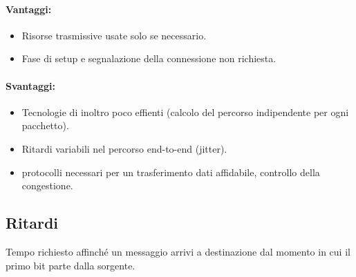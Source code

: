     \paragraph*{Vantaggi:}
    \begin{itemize}
        \item Risorse trasmissive usate solo se necessario.
        \item Fase di setup e segnalazione della connessione non richiesta.
    \end{itemize}

    \paragraph*{Svantaggi:}
    \begin{itemize}
        \item Tecnologie di inoltro poco effienti (calcolo del percorso indipendente per ogni pacchetto).
        \item Ritardi variabili nel percorso end-to-end (jitter).
        \item protocolli necessari per un trasferimento dati affidabile, controllo della congestione.
    \end{itemize}

    \subsection{Ritardi}

    \begin{definition}[Latenza] 
        Tempo richiesto affinché un messaggio arrivi a destinazione dal momento in cui il primo bit parte dalla sorgente.
    \end{definition}

